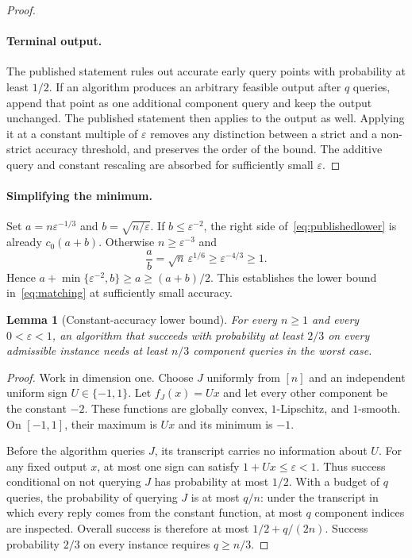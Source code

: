 \documentclass[11pt,a4paper]{article}
\newtheorem{lemma}[theorem]{Lemma}
\theoremstyle{definition}\newtheorem{definition}[theorem]{Definition}
\theoremstyle{remark}\newtheorem{remark}[theorem]{Remark}
\newcommand{\eps}{\varepsilon}
\begin{document}
\begin{proof}
\paragraph{Terminal output.}
The published statement rules out accurate early query points with
probability at least $1/2$. If an algorithm produces an arbitrary feasible
output after $q$ queries, append that point as one additional component
query and keep the output unchanged. The published statement then applies
to the output as well. Applying it at a constant multiple of $\eps$
removes any distinction between a strict and a non-strict accuracy
threshold, and preserves the order of the bound. The additive query and
constant rescaling are absorbed for sufficiently small $\eps$.
\end{proof}

\paragraph{Simplifying the minimum.}
Set $a=n\eps^{-1/3}$ and $b=\sqrt{n/\eps}$. If
$b\le\eps^{-2}$, the right side of~\eqref{eq:publishedlower} is already
$c_0(a+b)$. Otherwise $n\ge\eps^{-3}$ and
\[
 \frac{a}{b}=\sqrt n\,\eps^{1/6}\ge\eps^{-4/3}\ge1.
\]
Hence $a+\min\{\eps^{-2},b\}\ge a\ge(a+b)/2$. This establishes
the lower bound in~\eqref{eq:matching} at sufficiently small accuracy.

\begin{lemma}[Constant-accuracy lower bound]\label{lem:constant-lower}
For every $n\ge1$ and every $0<\eps<1$, an algorithm that succeeds
with probability at least $2/3$ on every admissible instance needs at
least $n/3$ component queries in the worst case.
\end{lemma}
\begin{proof}
Work in dimension one. Choose $J$ uniformly from $[n]$ and an independent
uniform sign $U\in\{-1,1\}$. Let $f_J(x)=Ux$ and let every other
component be the constant $-2$. These functions are globally convex,
$1$-Lipschitz, and $1$-smooth. On $[-1,1]$, their maximum is $Ux$ and
its minimum is $-1$.

Before the algorithm queries $J$, its transcript carries no information
about $U$. For any fixed output $x$, at most one sign can satisfy
$1+Ux\le\eps<1$. Thus success conditional on not querying $J$ has
probability at most $1/2$. With a budget of $q$ queries, the probability
of querying $J$ is at most $q/n$: under the transcript in which every
reply comes from the constant function, at most $q$ component indices
are inspected. Overall success is therefore at most
$1/2+q/(2n)$. Success probability $2/3$ on every instance requires
$q\ge n/3$.
\end{proof}
\end{document}
